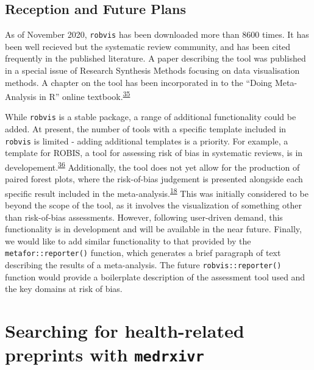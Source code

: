 \documentclass[a4paper, nobind]{templates/ociamthesis}
\begin{document}
\hypertarget{reception-and-future-plans}{%
\subsection{Reception and Future Plans}\label{reception-and-future-plans}}

As of November 2020, \texttt{robvis} has been downloaded more than 8600 times. It has been well recieved but the systematic review community, and has been cited frequently in the published literature. A paper describing the tool was published in a special issue of Research Synthesis Methods focusing on data visualisation methods. A chapter on the tool has been incorporated in to the ``Doing Meta-Analysis in R'' online textbook.\textsuperscript{\protect\hyperlink{ref-mathias_harrer_2019_2551803}{35}}

While \texttt{robvis} is a stable package, a range of additional functionality could be added. At present, the number of tools with a specific template included in \texttt{robvis} is limited - adding additional templates is a priority. For example, a template for ROBIS, a tool for assessing risk of bias in systematic reviews, is in developement.\textsuperscript{\protect\hyperlink{ref-whiting2016robis}{36}} Additionally, the tool does not yet allow for the production of paired forest plots, where the risk-of-bias judgement is presented alongside each specific result included in the meta-analysis.\textsuperscript{\protect\hyperlink{ref-cochranechpt7}{18}} This was initially considered to be beyond the scope of the tool, as it involves the visualization of something other than risk-of-bias assessments. However, following user-driven demand, this functionality is in development and will be available in the near future. Finally, we would like to add similar functionality to that provided by the \texttt{metafor::reporter()} function, which generates a brief paragraph of text describing the results of a meta-analysis. The future \texttt{robvis::reporter()} function would provide a boilerplate description of the assessment tool used and the key domains at risk of bias.

\hypertarget{searching-for-health-related-preprints-with-medrxivr}{%
\section{\texorpdfstring{Searching for health-related preprints with \texttt{medrxivr}}{Searching for health-related preprints with medrxivr}}\label{searching-for-health-related-preprints-with-medrxivr}}
\end{document}

